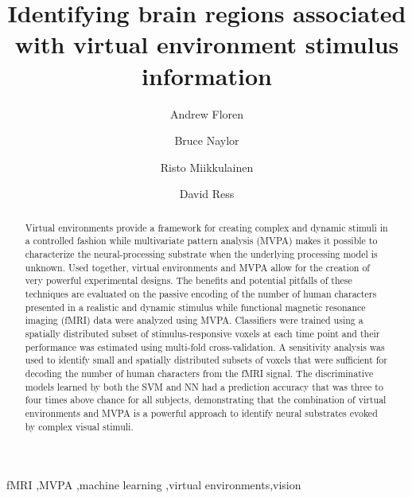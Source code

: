\documentclass[5p,authoryear]{elsarticle}
\begin{document}
\begin{frontmatter}

\title{Identifying brain regions associated with virtual environment stimulus information}

\author[ECE,NS]{Andrew Floren}

\author[NS]{Bruce Naylor}

\author[CS]{Risto Miikkulainen}

\author[BCM]{David Ress}

\address[ECE]{Department of Electrical and Computer Engineering}
\address[NS]{Department of Neuroscience}
\address[CS]{Computer Science Department \\ The University of Texas at Austin, Austin, TX 78712 USA}
\address[BCM]{Department of Neuroscience \\ Baylor College of Medicine, Houston, TX 77030 USA}


\begin{abstract}
Virtual environments provide a framework for creating complex and dynamic stimuli in a controlled fashion while multivariate pattern analysis (MVPA) makes it possible to characterize the neural-processing substrate when the underlying processing model is unknown. 
Used together, virtual environments and MVPA allow for the creation of very powerful experimental designs. 
The benefits and potential pitfalls of these techniques are evaluated on the passive encoding of the number of human characters presented in a realistic and dynamic stimulus while functional magnetic resonance imaging (fMRI) data were analyzed using MVPA. 
Classifiers were trained using a spatially distributed subset of stimulus-responsive voxels at each time point and their performance was estimated using multi-fold cross-validation.
A sensitivity analysis was used to identify small and spatially distributed subsets of voxels that were sufficient for decoding the number of human characters from the fMRI signal.
The discriminative models learned by both the SVM and NN had a prediction accuracy that was three to four times above chance for all subjects, demonstrating that the combination of virtual environments and MVPA is a powerful approach to identify neural substrates evoked by complex visual stimuli.
\end{abstract}

\begin{keyword}
fMRI \sep MVPA \sep machine learning \sep virtual environments\sep vision
\end{keyword}

\end{frontmatter}
\end{document}
